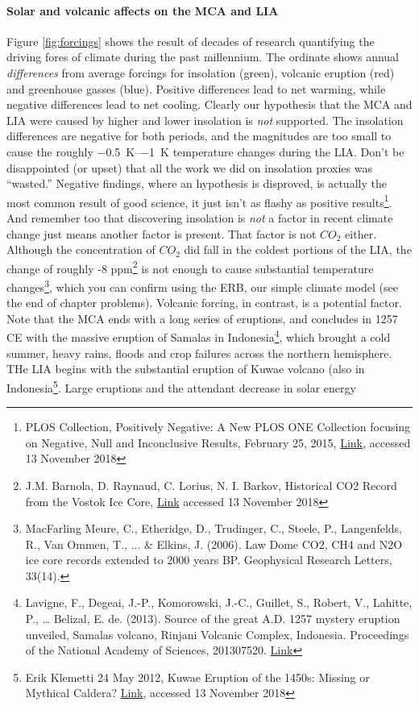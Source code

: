 \documentclass[amstex,12pt]{book}
\begin{document}
\paragraph{Solar and volcanic affects on the MCA and LIA} 
Figure \ref{fig:forcings} shows the result of decades of research quantifying the driving fores of climate during the past millennium. The ordinate shows annual \emph{differences} from  average forcings for insolation (green), volcanic eruption (red) and greenhouse gasses (blue). Positive differences lead to net warming, while negative differences lead to net cooling. Clearly our hypothesis that the MCA and LIA were caused by higher and lower insolation is \emph{not} supported. The insolation differences are negative for both periods, and the magnitudes are too small to cause the roughly \SIrange{-0.5}{-1}{\kelvin} temperature changes during the LIA. Don't be disappointed (or upset) that all the work we did on insolation proxies was ``wasted.'' Negative findings, where an hypothesis is disproved, is actually the most common result of good science, it just isn't as flashy as positive results\footnote{PLOS Collection, Positively Negative: A New PLOS ONE Collection focusing on Negative, Null and Inconclusive Results, February 25, 2015,  \href{https://blogs.plos.org/everyone/2015/02/25/positively-negative-new-plos-one-collection-focusing-negative-null-inconclusive-results/}{Link}, accessed 13 November 2018}. And remember too that discovering insolation is \emph{not} a factor in recent climate change just means another factor is present. That factor is not $CO_2$ either. Although the concentration of $CO_2$ did fall in the coldest portions of the LIA, the change of roughly -8 ppm\footnote{J.M. Barnola, D. Raynaud, C. Lorius, N. I. Barkov, Historical CO2 Record from the Vostok Ice Core, \href{http://cdiac.ornl.gov/ftp/trends/co2/vostok.icecore.co2}{Link} accessed 13 November 2018} is not enough to cause substantial temperature changes\footnote{MacFarling Meure, C., Etheridge, D., Trudinger, C., Steele, P., Langenfelds, R., Van Ommen, T., ... \& Elkins, J. (2006). Law Dome CO2, CH4 and N2O ice core records extended to 2000 years BP. Geophysical Research Letters, 33(14).}, which you can confirm using the ERB, our simple climate model (see the end of chapter problems). Volcanic forcing, in contrast, is a potential factor. Note that the MCA ends with a long series of eruptions, and concludes in 1257 CE with the massive eruption of Samalas in Indonesia\footnote{Lavigne, F., Degeai, J.-P., Komorowski, J.-C., Guillet, S., Robert, V., Lahitte, P., … Belizal, E. de. (2013). Source of the great A.D. 1257 mystery eruption unveiled, Samalas volcano, Rinjani Volcanic Complex, Indonesia. Proceedings of the National Academy of Sciences, 201307520. \href{https://doi.org/10.1073/pnas.1307520110}{Link}}, which brought a cold summer, heavy rains, floods and crop failures across the northern hemisphere. THe LIA begins with the substantial eruption of Kuwae volcano (also in Indonesia\footnote{Erik Klemetti 24 May 2012, Kuwae Eruption of the 1450s: Missing or Mythical Caldera? \href{https://www.wired.com/2012/05/kuwae-eruption-of-the-1450s-missing-or-mythical-caldera/}{Link}, accessed 13 November 2018}. Large eruptions and the attendant decrease in solar energy 
\end{document}
